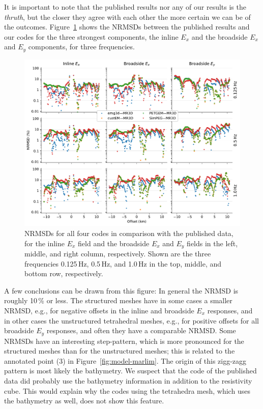\documentclass[onecolumn,extra,camera]{gji}
\begin{document}
It is important to note that the published results nor any of our results is the \emph{thruth}, but the closer they agree with each other the more certain we can be of the outcomes. Figure~\ref{fig:results-marlim_2published} shows the NRMSDs between the published results and our codes for the three strongest components, the inline $E_x$ and the broadside $E_x$ and $E_y$ components, for three frequencies.
%
\begin{figure}
  \centering
  \includegraphics[width=.9\linewidth]{figures/results-marlim_2published}
  \caption{NRMSDs for all four codes in comparison with the published data, for the inline $E_x$ field and the broadside $E_x$ and $E_y$ fields in the left, middle, and right column, respectively. Shown are the three frequencies 0.125\,Hz, 0.5\,Hz, and 1.0\,Hz in the top, middle, and bottom row, respectively.}
  \label{fig:results-marlim_2published}
\end{figure}
%
A few conclusions can be drawn from this figure: In general the NRMSD is roughly 10\,\% or less. The structured meshes have in some cases a smaller NRMSD, e.g., for negative offsets in the inline and broadside $E_x$ responses, and in other cases the unstructured tetrahedral meshes, e.g., for positive offsets for all broadside $E_y$ responses, and often they have a comparable NRMSD. Some NRMSDs have an interesting step-pattern, which is more pronounced for the structured meshes than for the unstructured meshes; this is related to the annotated point (3) in Figure~\ref{fig:model-marlim}. The origin of this zigg-zagg pattern is most likely the bathymetry. We suspect that the code of the published data did probably use the bathymetry information in addition to the resistivity cube. This would explain why the codes using the tetrahedra mesh, which uses the bathymetry as well, does not show this feature.
\end{document}
